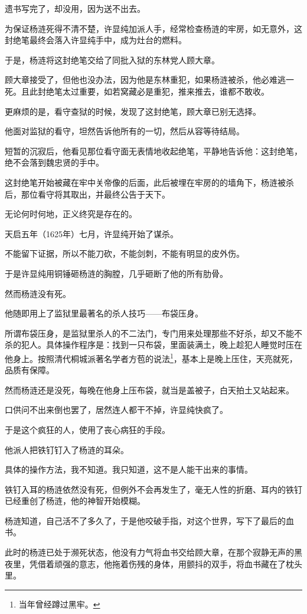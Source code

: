 \begin{multicols}{\theparacolNo}
		遗书写完了，却没用，因为送不出去。

		为保证杨涟死得不清不楚，许显纯加派人手，经常检查杨涟的牢房，如无意外，这封绝笔最终会落入许显纯手中，成为灶台的燃料。

		于是，杨涟将这封绝笔交给了同批入狱的东林党人顾大章。

		顾大章接受了，但他也没办法，因为他是东林重犯，如果杨涟被杀，他必难逃一死。且此封绝笔太过重要，如若窝藏必是重犯，推来推去，谁都不敢收。

		更麻烦的是，看守查狱的时候，发现了这封绝笔，顾大章已别无选择。

		他面对监狱的看守，坦然告诉他所有的一切，然后从容等待结局。

		短暂的沉寂后，他看见那位看守面无表情地收起绝笔，平静地告诉他：这封绝笔，绝不会落到魏忠贤的手中。

		这封绝笔开始被藏在牢中关帝像的后面，此后被埋在牢房的的墙角下，杨涟被杀后，那位看守将其取出，并最终公告于天下。

		无论何时何地，正义终究是存在的。

		天启五年（1625年）七月，许显纯开始了谋杀。

		不能留下证据，所以不能刀砍，不能剑刺，不能有明显的皮外伤。

		于是许显纯用铜锤砸杨涟的胸膛，几乎砸断了他的所有肋骨。

		然而杨涟没有死。

		他随即用上了监狱里最著名的杀人技巧——布袋压身。

		所谓布袋压身，是监狱里杀人的不二法门，专门用来处理那些不好杀，却又不能不杀的犯人。具体操作程序是：找到一只布袋，里面装满土，晚上趁犯人睡觉时压在他身上。按照清代桐城派著名学者方苞的说法\footnote{当年曾经蹲过黑牢。}，基本上是晚上压住，天亮就死，品质有保障。

		然而杨涟还是没死，每晚在他身上压布袋，就当是盖被子，白天拍土又站起来。

		口供问不出来倒也罢了，居然连人都干不掉，许显纯快疯了。

		于是这个疯狂的人，使用了丧心病狂的手段。

		他派人把铁钉钉入了杨涟的耳朵。

		具体的操作方法，我不知道。我只知道，这不是人能干出来的事情。

		铁钉入耳的杨涟依然没有死，但例外不会再发生了，毫无人性的折磨、耳内的铁钉已经重创了杨涟，他的神智开始模糊。

		杨涟知道，自己活不了多久了，于是他咬破手指，对这个世界，写下了最后的血书。

		此时的杨涟已处于濒死状态，他没有力气将血书交给顾大章，在那个寂静无声的黑夜里，凭借着顽强的意志，他拖着伤残的身体，用颤抖的双手，将血书藏在了枕头里。


\end{multicols}
